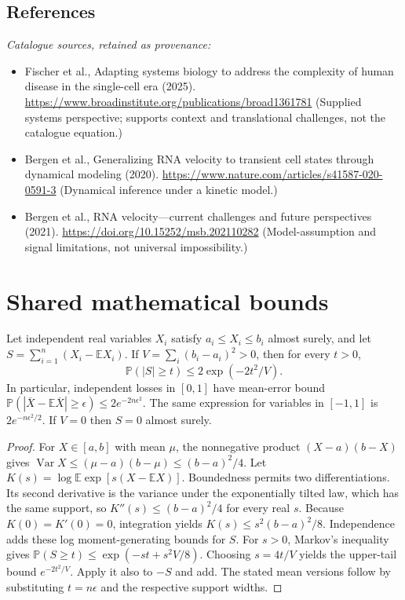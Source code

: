 \documentclass[11pt]{article}
\begin{document}
\subsection{References}
\noindent\emph{Catalogue sources, retained as provenance:}
\begin{itemize}
\item Fischer et al., Adapting systems biology to address the complexity of human disease in the single-cell era (2025). \url{https://www.broadinstitute.org/publications/broad1361781} (Supplied systems perspective; supports context and translational challenges, not the catalogue equation.)
\item Bergen et al., Generalizing RNA velocity to transient cell states through dynamical modeling (2020). \url{https://www.nature.com/articles/s41587-020-0591-3} (Dynamical inference under a kinetic model.)
\item Bergen et al., RNA velocity---current challenges and future perspectives (2021). \url{https://doi.org/10.15252/msb.202110282} (Model-assumption and signal limitations, not universal impossibility.)
\end{itemize}




\section{Shared mathematical bounds}\label{app:bounds}
\begin{lemma}\label{lem:bounded}
Let independent real variables $X_i$ satisfy $a_i\leq X_i\leq b_i$ almost surely,
and let $S=\sum_{i=1}^n(X_i-\mathbb{E} X_i)$. If
$V=\sum_i(b_i-a_i)^2>0$, then for every $t>0$,
\[
 \mathbb{P}(|S|\geq t)\leq 2\exp(-2t^2/V).
\]
In particular, independent losses in $[0,1]$ have mean-error bound
$\mathbb{P}(|\overline X-\mathbb{E}\overline X|\geq\epsilon)
\leq2e^{-2n\epsilon^2}$. The same expression for variables in $[-1,1]$
is $2e^{-n\epsilon^2/2}$. If $V=0$ then $S=0$ almost surely.
\end{lemma}
\begin{proof}
For $X\in[a,b]$ with mean $\mu$, the nonnegative product
$(X-a)(b-X)$ gives
$\operatorname{Var} X\leq(\mu-a)(b-\mu)\leq(b-a)^2/4$.
Let $K(s)=\log\mathbb{E}\exp[s(X-\mathbb{E} X)]$.
Boundedness permits two differentiations. Its second derivative is the variance
under the exponentially tilted law, which has the same support, so
$K''(s)\leq(b-a)^2/4$ for every real $s$.
Because $K(0)=K'(0)=0$, integration yields
$K(s)\leq s^2(b-a)^2/8$.
Independence adds these log moment-generating bounds for $S$.
For $s>0$, Markov's inequality gives
$\mathbb{P}(S\geq t)\leq\exp(-st+s^2V/8)$.
Choosing $s=4t/V$ yields the upper-tail bound $e^{-2t^2/V}$.
Apply it also to $-S$ and add. The stated mean versions follow by substituting
$t=n\epsilon$ and the respective support widths.
\end{proof}
\end{document}
